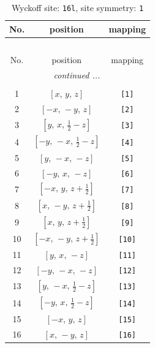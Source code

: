 \documentclass[fleqn,8pt]{jsarticle}
\begin{document}
\begin{longtable}{ccc}
\caption{Wyckoff site: {\tt 16l}, site symmetry: {\tt 1}}
 \\
 \hline \hline
No. & position & mapping \\ \hline \endfirsthead

\multicolumn{2}{l}{\tablename\ \thetable{}} \\
 \hline \hline
No. & position & mapping \\ \hline \endhead

 \hline \hline
\multicolumn{2}{r}{\footnotesize\it continued ...} \\ \endfoot

 \hline \hline
\multicolumn{2}{r}{} \\ \endlastfoot

1 & $\left[ x,\, y,\, z \right]$ & {\tt [1]} \\ \hline
2 & $\left[ - x,\, - y,\, z \right]$ & {\tt [2]} \\ \hline
3 & $\left[ y,\, x,\, \frac{1}{2} - z \right]$ & {\tt [3]} \\ \hline
4 & $\left[ - y,\, - x,\, \frac{1}{2} - z \right]$ & {\tt [4]} \\ \hline
5 & $\left[ y,\, - x,\, - z \right]$ & {\tt [5]} \\ \hline
6 & $\left[ - y,\, x,\, - z \right]$ & {\tt [6]} \\ \hline
7 & $\left[ - x,\, y,\, z + \frac{1}{2} \right]$ & {\tt [7]} \\ \hline
8 & $\left[ x,\, - y,\, z + \frac{1}{2} \right]$ & {\tt [8]} \\ \hline
9 & $\left[ x,\, y,\, z + \frac{1}{2} \right]$ & {\tt [9]} \\ \hline
10 & $\left[ - x,\, - y,\, z + \frac{1}{2} \right]$ & {\tt [10]} \\ \hline
11 & $\left[ y,\, x,\, - z \right]$ & {\tt [11]} \\ \hline
12 & $\left[ - y,\, - x,\, - z \right]$ & {\tt [12]} \\ \hline
13 & $\left[ y,\, - x,\, \frac{1}{2} - z \right]$ & {\tt [13]} \\ \hline
14 & $\left[ - y,\, x,\, \frac{1}{2} - z \right]$ & {\tt [14]} \\ \hline
15 & $\left[ - x,\, y,\, z \right]$ & {\tt [15]} \\ \hline
16 & $\left[ x,\, - y,\, z \right]$ & {\tt [16]} \\
\end{longtable}
\end{document}
